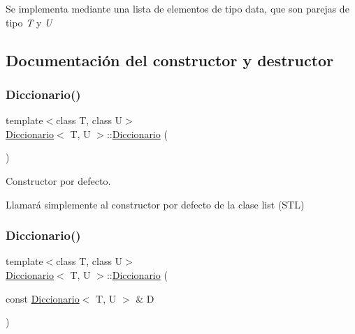 Se implementa mediante una lista de elementos de tipo data, que son parejas de tipo {\itshape T} y {\itshape U} 

\subsection{Documentación del constructor y destructor}
\mbox{\label{classDiccionario_adad32f7bfd34b7a8631ff5f26033b369}} 
\subsubsection{\texorpdfstring{Diccionario()}{Diccionario()}\hspace{0.1cm}{\footnotesize\ttfamily [1/2]}}
{\footnotesize\ttfamily template$<$class T, class U$>$ \\
\hyperlink{classDiccionario}{Diccionario}$<$ T, U $>$\+::\hyperlink{classDiccionario}{Diccionario} (\begin{DoxyParamCaption}{ }\end{DoxyParamCaption})\hspace{0.3cm}{\ttfamily [inline]}}



Constructor por defecto. 

Llamará simplemente al constructor por defecto de la clase list (S\+TL) \mbox{\label{classDiccionario_ad8917f4e401b473139403dc5964e8307}} 
\subsubsection{\texorpdfstring{Diccionario()}{Diccionario()}\hspace{0.1cm}{\footnotesize\ttfamily [2/2]}}
{\footnotesize\ttfamily template$<$class T, class U$>$ \\
\hyperlink{classDiccionario}{Diccionario}$<$ T, U $>$\+::\hyperlink{classDiccionario}{Diccionario} (\begin{DoxyParamCaption}\item[{const \hyperlink{classDiccionario}{Diccionario}$<$ T, U $>$ \&}]{D }\end{DoxyParamCaption})\hspace{0.3cm}{\ttfamily [inline]}}



